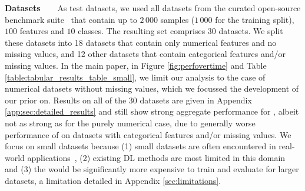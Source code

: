 \documentclass{article}
\newcommand{\slimparagraph}[1]{\textbf{#1~~~}}
\begin{document}
\slimparagraph{Datasets} As test datasets, we used all datasets from the curated open-source \openmlcc{} benchmark suite~\citep{bischl-neuripsdbt21a} that contain up to $2\,000$ samples ($1\,000$ for the training split), $100$ features and $10$ classes. The resulting set comprises $30$ datasets. We split these datasets into 18 datasets that contain only numerical features and no missing values, and 12 other datasets that contain categorical features and/or missing values.
In the main paper, in Figure \ref{fig:perfovertime} and Table \ref{table:tabular_results_table_small}, we limit our analysis to the case of numerical datasets without missing values, which we focussed the development of our \methodname{} prior on. Results on all of the 30 datasets are given in Appendix \ref{app:sec:detailed_results} and still show strong aggregate performance for \methodname{}, albeit not as strong as for the purely numerical case, due to generally worse performance of \methodname{} on datasets with categorical features and/or missing values. 
We focus on small datasets because (1) small datasets are often encountered in real-world applications~\citep{dua_2019}, (2) existing DL methods are most limited in this domain~\citep{grinsztajn2022why} and (3) the \methodname{} would be significantly more expensive to train and evaluate for larger datasets, a limitation detailed in Appendix \ref{sec:limitations}.


\end{document}
